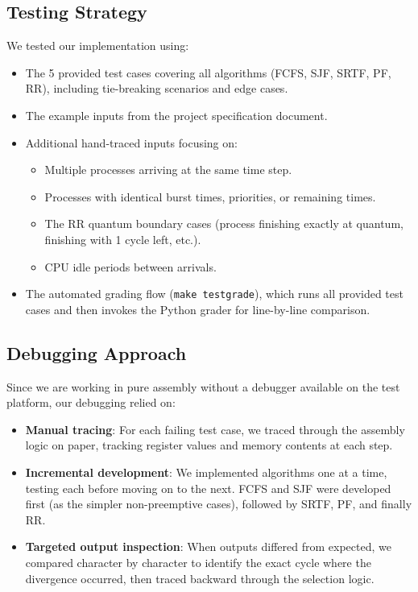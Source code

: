 \documentclass[a4paper,12pt]{article}
\begin{document}
\subsection{Testing Strategy}

We tested our implementation using:
\begin{itemize}
    \item The 5 provided test cases covering all algorithms (FCFS, SJF, SRTF, PF, RR), including tie-breaking scenarios and edge cases.
    \item The example inputs from the project specification document.
    \item Additional hand-traced inputs focusing on:
    \begin{itemize}
        \item Multiple processes arriving at the same time step.
        \item Processes with identical burst times, priorities, or remaining times.
        \item The RR quantum boundary cases (process finishing exactly at quantum, finishing with 1 cycle left, etc.).
        \item CPU idle periods between arrivals.
    \end{itemize}
    \item The automated grading flow (\texttt{make testgrade}), which runs all provided test cases and then invokes the Python grader for line-by-line comparison.
\end{itemize}

\subsection{Debugging Approach}

Since we are working in pure assembly without a debugger available on the test platform, our debugging relied on:
\begin{itemize}
    \item \textbf{Manual tracing}: For each failing test case, we traced through the assembly logic on paper, tracking register values and memory contents at each step.
    \item \textbf{Incremental development}: We implemented algorithms one at a time, testing each before moving on to the next. FCFS and SJF were developed first (as the simpler non-preemptive cases), followed by SRTF, PF, and finally RR.
    \item \textbf{Targeted output inspection}: When outputs differed from expected, we compared character by character to identify the exact cycle where the divergence occurred, then traced backward through the selection logic.
\end{itemize}
\end{document}
